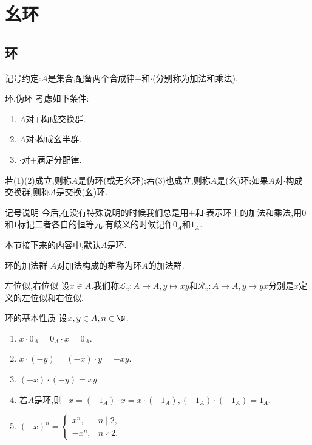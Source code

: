 \chapter{幺环}

\section{环}

记号约定:$A$是集合,配备两个合成律$+$和$\cdot$(分别称为加法和乘法).

\begin{definition}{环,伪环}{}
	考虑如下条件:
	\begin{enumerate}
		\item $A$对$+$构成交换群.
		\item $A$对$\cdot$构成幺半群.
		\item $\cdot$对$+$满足分配律.
	\end{enumerate}
	若(1)(2)成立,则称$A$是伪环(或无幺环);若(3)也成立,则称$A$是(幺)环;如果$A$对$\cdot$构成交换群,则称$A$是交换(幺)环.
\end{definition}

\begin{remark}{记号说明}{}
	今后,在没有特殊说明的时候我们总是用$+$和$\cdot$表示环上的加法和乘法,用$0$和$1$标记二者各自的恒等元,有歧义的时候记作$0_{A}$和$1_{A}$.
\end{remark}

本节接下来的内容中,默认$A$是环.

\begin{definition}{环的加法群}{}
	$A$对加法构成的群称为环$A$的加法群.
\end{definition}

\begin{definition}{左位似,右位似}{}
	设$x\in A$.我们称$\mathcal{L}_{x}:A\to A,y\mapsto xy$和$\mathcal{R}_{x}:A\to A,y\mapsto yx$分别是$x$定义的左位似和右位似.
\end{definition}

\begin{proposition}{环的基本性质}{}
	设$x,y\in A,n\in\N$.
	\begin{enumerate}
		\item $x\cdot 0_{A}=0_{A}\cdot x=0_{A}$.
		\item $x\cdot\left(-y\right)=\left(-x\right)\cdot y=-xy$.
		\item $\left(-x\right)\cdot\left(-y\right)=xy$.
		\item 若$A$是环,则$-x=\left(-1_{A}\right)\cdot x=x\cdot\left(-1_{A}\right),\left(-1_{A}\right)\cdot\left(-1_{A}\right)=1_{A}$.
		\item $\left(-x\right)^{n}=
		\begin{cases}
			x^{n},&n\mid 2,\\
			-x^{n},&n\nmid 2.
		\end{cases}
		$
	\end{enumerate}
\end{proposition}

